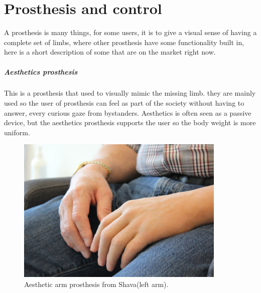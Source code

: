 \chapter{Prosthesis and control} \label{prostheses}

A prosthesis is many things, for some users, it is to give a visual sense of having a complete set of limbs, where other prosthesis have some functionality built in, here is a short description of some that are on the market right now.

\paragraph{Aesthetics prosthesis}
This is a prosthesis that used to visually mimic the missing limb. they are mainly used so the user of prosthesis can feel as part of the society without having to answer, every curious gaze from bystanders. Aesthetics is often seen as a passive device, but the aesthetics prosthesis supports the user so the body weight is more uniform\cite{aesthetic}.  
\begin{figure}[H]
    \centering
    \includegraphics[width=10cm,height=7cm]{Figures/Contextual_figures/ProsthesesPics/aestikarm.png}
    \caption{Aesthetic arm prosthesis from Shava(left arm)\cite{aesthetic}.}
    \label{fig:aesthetic}
\end{figure}
